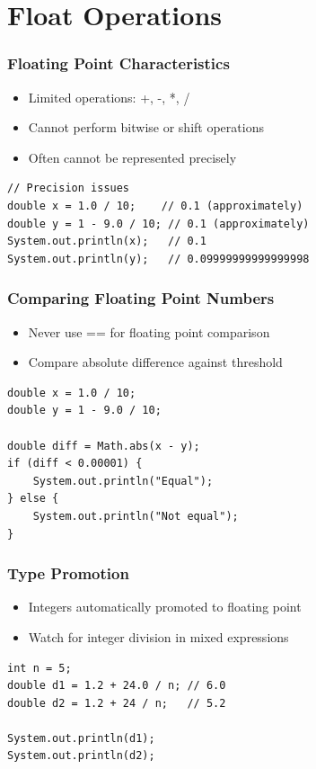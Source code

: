 \documentclass[serif, aspectratio=169]{beamer}
\begin{document}
\section{Float Operations}
\begin{frame}[fragile]
\frametitle{Floating Point Characteristics}
\begin{itemize}
    \item Limited operations: +, -, *, /
    \item Cannot perform bitwise or shift operations
    \item Often cannot be represented precisely
\end{itemize}
\begin{lstlisting}
// Precision issues
double x = 1.0 / 10;    // 0.1 (approximately)
double y = 1 - 9.0 / 10; // 0.1 (approximately)
System.out.println(x);   // 0.1
System.out.println(y);   // 0.09999999999999998
\end{lstlisting}
\end{frame}

\begin{frame}[fragile]
\frametitle{Comparing Floating Point Numbers}
\begin{itemize}
    \item Never use == for floating point comparison
    \item Compare absolute difference against threshold
\end{itemize}
\begin{lstlisting}
double x = 1.0 / 10;
double y = 1 - 9.0 / 10;

double diff = Math.abs(x - y);
if (diff < 0.00001) {
    System.out.println("Equal");
} else {
    System.out.println("Not equal");
}
\end{lstlisting}
\end{frame}

\begin{frame}[fragile]
\frametitle{Type Promotion}
\begin{itemize}
    \item Integers automatically promoted to floating point
    \item Watch for integer division in mixed expressions
\end{itemize}
\begin{lstlisting}
int n = 5;
double d1 = 1.2 + 24.0 / n; // 6.0
double d2 = 1.2 + 24 / n;   // 5.2

System.out.println(d1);
System.out.println(d2);
\end{lstlisting}
\end{frame}
\end{document}
